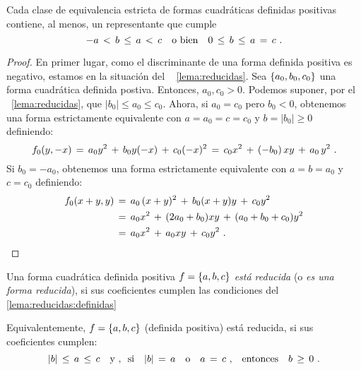 \begin{lemaReducidas}\label{lema:reducidas:definidas}
	Cada clase de equivalencia estricta de formas cuadr\'aticas
	definidas positivas contiene, al menos, un representante que
	cumple
	\begin{displaymath}
		-a\,<\,b\,\leq\,a\,<\,c\quad\text{o bien}\quad
		0\,\leq\,b\,\leq\,a\,=\,c
		\text{ .}
	\end{displaymath}
\end{lemaReducidas}

\begin{proof}
	En primer lugar, como el discriminante de una forma definida
	positiva es negativo, estamos en la situaci\'on del \lemaname~%
	\ref{lema:reducidas}. Sea $\left\{a_0,b_0,c_0\right\}$ una forma
	cuadr\'atica definida postiva. Entonces, $a_0,c_0>0$.
	Podemos suponer, por el \lemaname~\ref{lema:reducidas}, que
	$|b_0|\leq a_0\leq c_0$. Ahora, si $a_0=c_0$ pero $b_0<0$,
	obtenemos una forma estrictamente equivalente con $a=a_0=c=c_0$ y
	$b=|b_0|\geq 0$ definiendo:
	\begin{displaymath}
		f_0(y,-x)\,=\,a_0y^2\,+\,b_0y(-x)\,+\,c_0(-x)^2\,=\,
			c_0x^2\,+\,(-b_0)\,xy\,+\,a_0\,y^2
		\text{ .}
	\end{displaymath}
	Si $b_0=-a_0$, obtenemos una forma estrictamente equivalente con
	$a=b=a_0$ y $c=c_0$ definiendo:
	\begin{displaymath}
		\begin{aligned}
			f_0(x+y,y) & \,=\,
				a_0\,(x+y)^2\,+\,b_0(x+y)y\,+\,c_0y^2 \\
			& \,=\,a_0x^2\,+\,(2a_0+b_0)xy\,+\,(a_0+b_0+c_0)y^2 \\
			& \,=\,a_0x^2\,+\,a_0xy\,+\,c_0y^2
			\text{ .}
		\end{aligned}
	\end{displaymath}
\end{proof}

\begin{defReducidas}\label{def:reducidas}
	Una forma cuadr\'atica definida positiva $f=\left\{a,b,c\right\}$
	\emph{est\'a reducida} (o \emph{es una forma reducida}), si
	sus coeficientes cumplen las condiciones del \lemaname~%
	\ref{lema:reducidas:definidas}
\end{defReducidas}

\begin{obsReducidas}\label{obs:reducidas:definicion}
	Equivalentemente, $f=\left\{a,b,c\right\}$ (definida positiva)
	est\'a reducida, si sus coeficientes cumplen:
	\begin{displaymath}
		|b|\,\leq\,a\,\leq\,c\quad\text{y~,~~si}\quad
		|b|\,=\,a\quad\text{o}\quad a\,=\,c\text{ ,}
		\quad\text{entonces}\quad
		b\,\geq\,0
		\text{ .}
	\end{displaymath}
\end{obsReducidas}

